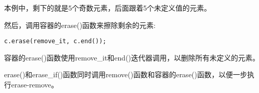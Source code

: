 本例中，剩下的就是5个奇数元素，后面跟着5个未定义值的元素。

然后，调用容器的erase()函数来擦除剩余的元素:

\begin{lstlisting}[style=styleCXX]
c.erase(remove_it, c.end());
\end{lstlisting}

容器的erase()函数使用remove\_it和end()迭代器调用，以删除所有未定义的元素。

erase()和erase\_if()函数同时调用remove()函数和容器的erase()函数，以便一步执行erase-remove。




